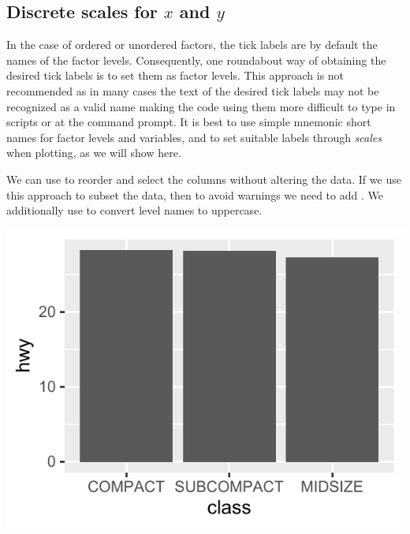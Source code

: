 \documentclass[krantz2]{krantz}\usepackage{knitr}
\begin{document}
\subsection{Discrete scales for $x$ and $y$}

In the case of ordered or unordered factors, the tick labels are by default the names of the factor levels. Consequently, one roundabout way of obtaining the desired tick labels is to set them as factor levels. This approach is not recommended as in many cases the text of the desired tick labels may not be recognized as a valid name making the code using them more difficult to type in scripts or at the command prompt. It is best to use simple mnemonic short names for factor levels and variables, and to set suitable labels through \emph{scales} when plotting, as we will show here.

We can use  to reorder and select the columns without altering the data. If we use this approach to subset the data, then to avoid warnings we need to add . We additionally use  to convert level names to uppercase.


\begin{knitrout}\footnotesize
{}\color{fgcolor}\begin{kframe}
\begin{alltt}
  \hlopt{+}
  \hlstd{(} \hlstd{=} \hlstd{,}    \hlstd{=} \hlstd{)} \hlopt{+}
  \hlstd{(} \hlstd{=} \hlstd{(}\hlstd{,} \hlstd{,} \hlstd{),}
                    \hlstd{=} \hlstd{(}\hlstd{,} \hlstd{,} \hlstd{))}
\end{alltt}
\end{kframe}

{\centering \includegraphics[width=.54\textwidth]{figure/pos-scale-discrete-10-1}

}



\end{knitrout}
\end{document}
